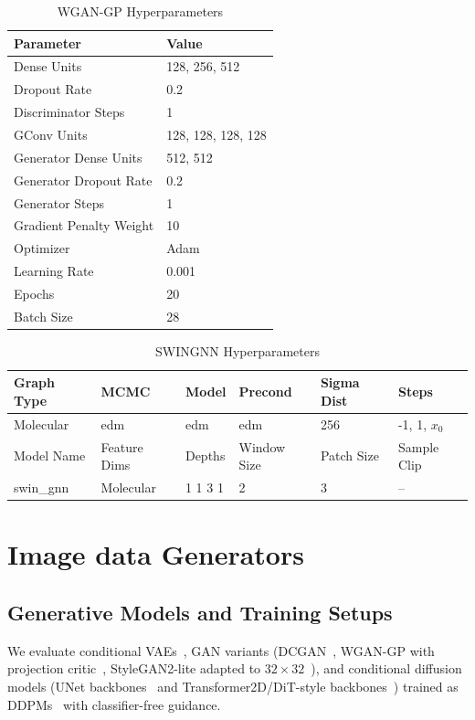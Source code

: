 \begin{table}[H]
\centering
\small
\caption{WGAN-GP Hyperparameters}
\begin{tabular}{ll}
\toprule
Parameter & Value \\
\midrule
Dense Units & 128, 256, 512 \\
Dropout Rate & 0.2 \\
Discriminator Steps & 1 \\
GConv Units & 128, 128, 128, 128 \\
Generator Dense Units & 512, 512 \\
Generator Dropout Rate & 0.2 \\
Generator Steps & 1 \\
Gradient Penalty Weight & 10 \\
Optimizer & Adam \\
Learning Rate & 0.001 \\
Epochs & 20 \\
Batch Size & 28 \\
\bottomrule
\end{tabular}
\end{table}
\FloatBarrier

\begin{table}[H]
\centering
\small
\caption{SWINGNN Hyperparameters}
\begin{tabular}{llllll}
\toprule
Graph Type & MCMC & Model & Precond & Sigma Dist & Steps \\
\midrule
Molecular & edm & edm & edm & 256 & -1, 1, $x_0$ \\
\bottomrule
\toprule
Model Name & Feature Dims & Depths & Window Size & Patch Size & Sample Clip \\
\midrule
swin\_gnn & Molecular & 1 1 3 1 & 2 & 3 & -- \\
\bottomrule
\end{tabular}
\end{table}
\FloatBarrier


\section{Image data Generators}
\subsection{Generative Models and Training Setups}
\label{app:image-models}

We evaluate conditional VAEs~\citep{kingma2014auto,rezende2014stochastic}, GAN variants (DCGAN~\citep{radford2016unsupervised}, WGAN-GP with projection
critic~\citep{gulrajani2017improved,miyato2018cgans}, StyleGAN2-lite adapted to $32{\times}32$~\citep{karras2020analyzing}), and conditional diffusion models
(UNet backbones~\citep{ronneberger2015u} and Transformer2D/DiT-style backbones~\citep{peebles2023di}) trained as
DDPMs~\citep{ho2020denoising} with classifier-free guidance.

